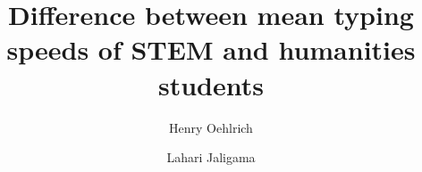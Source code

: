 \documentclass{article}
\author{Henry Oehlrich \and Lahari Jaligama}
\title{Difference between mean typing speeds of STEM and humanities students}
\begin{document}
\maketitle{}
\end{document}
